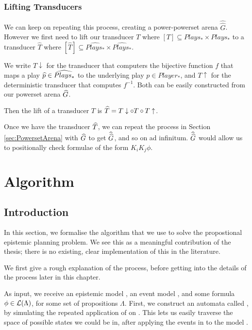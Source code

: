 \documentclass[12pt, a4paper]{article}
\begin{document}
\subsubsection{Lifting Transducers}

We can keep on repeating this process, creating a power-powerset arena
$\widehat{\widehat{G}}$. However we first need to lift our transducer $T$ where
$[T] \subseteq Plays_\ast \times Plays_\ast$ to a transducer $\widehat{T}$ where
$[\widehat{T}] \subseteq \widehat{Plays_\ast} \times \widehat{Plays_\ast}$.

We write $T\downarrow$ for the transducer that computers the bijective function
$f$ that maps a play $\widehat{p} \in \widehat{Plays_\ast}$ to the underlying play $p
\in Player_\ast$, and $T\uparrow$ for the deterministic transducer that computes
$f^{-1}$. Both can be easily constructed from our powerset arena $\widehat{G}$.

Then the lift of a transducer $T$ is $\widehat{T} = T\downarrow \circ T \circ
T\uparrow$.

Once we have the transducer $\widehat{T}$, we can repeat the process in Section
\ref{sec:PowersetArena} with $\widehat{G}$ to get $\widehat{\widehat{G}}$, and so on ad
infinitum. $\widehat{\widehat{G}}$ would allow us to positionally check formulae of the
form $K_i K_j \phi$.

\newpage

\section{Algorithm}

\subsection{Introduction}

In this section, we formalise the algorithm that we use to solve the
propostional epistemic planning problem. We see this as a meaningful
contribution of the thesis; there is no existing, clear implementation of this
in the literature.

We first give a rough explanation of the process, before getting into the
details of the process later in this chapter.

As input, we receive an epistemic model , an event model , and
some formula $\phi \in \mathcal{L}(\Lambda)$, for some set of propositions $\Lambda$.
First, we construct an automata called \mestar, by simulating the repeated
application of  on . This lets us easily traverse the space of
possible states we could be in, after applying the events in  to the
model .
\end{document}
